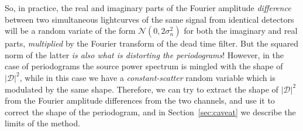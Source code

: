 \documentclass[twocolumn]{aastex61}
\newcommand{\Normal}{\ensuremath{{\mathcal N}}\xspace}
\begin{document}
So, in practice, the real and imaginary parts of the Fourier amplitude \textit{difference} between two simultaneous lightcurves of the same signal from identical detectors will be a random variate of the form $\Normal(0, 2\sigma_{n}^2)$ for both the imaginary and real parts, \textit{multiplied} by the Fourier transform of the dead time filter.
But the squared norm of the latter \textit{is also what is distorting the periodograms}!
However, in the case of periodograms the source power spectrum is mingled with the shape of $|\mathcal{D}|^2$, while in this case we have a \textit{constant-scatter} random variable which is modulated by the same shape. Therefore, we can try to extract the shape of $|\mathcal{D}|^2$ from the Fourier amplitude differences from the two channels, and use it to correct the shape of the periodogram, and in Section~\ref{sec:caveat} we describe the limits of the method.
\end{document}
